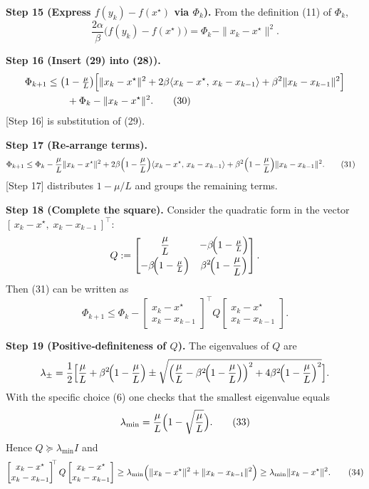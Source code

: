 \documentclass{article}
\begin{document}
\noindent\textbf{Step 15 (Express $f(y_k)-f(x^\star)$ via $\Phi_k$).}  
From the definition (11) of $\Phi_k$,
\[
\frac{2\alpha}{\beta}\bigl(f(y_k)-f(x^\star)\bigr)
= \Phi_k-\|x_k-x^\star\|^2 .
\tag{29}
\]

\noindent\textbf{Step 16 (Insert (29) into (28)).}
\begin{align}
\Phi_{k+1}
&\le\bigl(1-\tfrac{\mu}{L}\bigr)\Bigl[
\|x_k-x^\star\|^2
+2\beta\langle x_k-x^\star,\,x_k-x_{k-1}\rangle
+\beta^2\|x_k-x_{k-1}\|^2\Bigr] \nonumber\\
&\qquad +\Phi_k-\|x_k-x^\star\|^2 .
\tag{30}
\end{align}
[Step 16] is substitution of (29).

\noindent\textbf{Step 17 (Re‑arrange terms).}
\begin{align}
\Phi_{k+1}
&\le \Phi_k
-\frac{\mu}{L}\|x_k-x^\star\|^2
+2\beta\Bigl(1-\frac{\mu}{L}\Bigr)\langle x_k-x^\star,\,x_k-x_{k-1}\rangle
+\beta^2\Bigl(1-\frac{\mu}{L}\Bigr)\|x_k-x_{k-1}\|^2 .
\tag{31}
\end{align}
[Step 17] distributes $1-\mu/L$ and groups the remaining terms.

\noindent\textbf{Step 18 (Complete the square).}  
Consider the quadratic form in the vector $[\,x_k-x^\star,\;x_k-x_{k-1}\,]^\top$:
\[
Q:=\begin{bmatrix}
\displaystyle\frac{\mu}{L} & -\beta\!\Bigl(1-\frac{\mu}{L}\Bigr)\\[2mm]
-\beta\!\Bigl(1-\frac{\mu}{L}\Bigr) & \displaystyle\beta^2\!\Bigl(1-\frac{\mu}{L}\Bigr)
\end{bmatrix}.
\]
Then (31) can be written as
\[
\Phi_{k+1}\le \Phi_k - \begin{bmatrix}x_k-x^\star\\ x_k-x_{k-1}\end{bmatrix}^{\!\!\top} Q
\begin{bmatrix}x_k-x^\star\\ x_k-x_{k-1}\end{bmatrix}.
\tag{32}
\]

\noindent\textbf{Step 19 (Positive‑definiteness of $Q$).}  
The eigenvalues of $Q$ are
\[
\lambda_{\pm}= \frac12\Bigl[\frac{\mu}{L}+\beta^2\!\Bigl(1-\frac{\mu}{L}\Bigr)
\pm\sqrt{\Bigl(\frac{\mu}{L}-\beta^2\!\Bigl(1-\frac{\mu}{L}\Bigr)\Bigr)^2
+4\beta^2\!\Bigl(1-\frac{\mu}{L}\Bigr)^2}\Bigr].
\]
With the specific choice (6) one checks that the smallest eigenvalue equals
\[
\lambda_{\min}= \frac{\mu}{L}\Bigl(1-\sqrt{\frac{\mu}{L}}\Bigr) .
\tag{33}
\]
Hence $Q\succeq \lambda_{\min} I$ and
\[
\begin{bmatrix}x_k-x^\star\\ x_k-x_{k-1}\end{bmatrix}^{\!\!\top} Q
\begin{bmatrix}x_k-x^\star\\ x_k-x_{k-1}\end{bmatrix}
\ge \lambda_{\min}\Bigl(\|x_k-x^\star\|^2+\|x_k-x_{k-1}\|^2\Bigr)
\ge \lambda_{\min}\|x_k-x^\star\|^2 .
\tag{34}
\]
\end{document}
